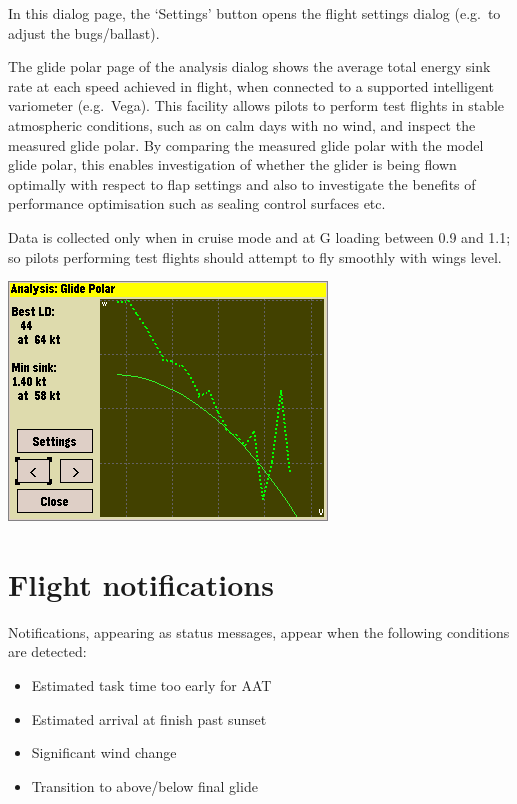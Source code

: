 \documentclass[a4paper,12pt]{refrep}
\begin{document}
In this dialog page, the `Settings' button opens the flight settings
dialog (e.g.\ to adjust the bugs/ballast).

The glide polar page of the analysis dialog shows the average total
energy sink rate at each speed achieved in flight, when connected to a
supported intelligent variometer (e.g.\ Vega).  This facility allows
pilots to perform test flights in stable atmospheric conditions, such
as on calm days with no wind, and inspect the measured glide polar.
By comparing the measured glide polar with the model glide polar, this
enables investigation of whether the glider is being flown optimally
with respect to flap settings and also to investigate the benefits of
performance optimisation such as sealing control surfaces etc.

Data is collected only when in cruise mode and at G loading between
0.9 and 1.1; so pilots performing test flights should attempt to fly
smoothly with wings level.

\begin{center}
\includegraphics[angle=0,width=\linewidth,keepaspectratio='true']{figures/shot-glidepolar.png}
\end{center}

\section{Flight notifications}

 Notifications, appearing as status messages, appear when the
 following conditions are detected: 
\begin{itemize}
\item Estimated task time too early for
 AAT 
\item Estimated arrival at finish past sunset
\item Significant wind change
\item Transition to above/below final glide
\end{itemize}
\end{document}
